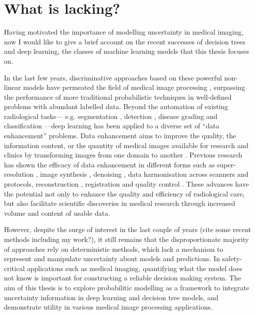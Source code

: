 \section{What is lacking?}
Having motivated the importance of modelling uncertainty in medical imaging, now I would like to give a brief account on the recent successes of decision trees and deep learning, the classes of machine learning models that this thesis focuses on. 

In the last few years, discriminative approaches based on these powerful non-linear models have permeated the field of medical image processing \cite{criminisi2013decision,shen2017deep,litjens2017survey}, surpassing the performance of more traditional probabilistic techniques in well-defined problems with abundant labelled data. Beyond the automation of existing radiological tasks--- e.g. segmentation \cite{kamnitsas2017efficient}, detection \cite{roth2014new}, disease grading and classification \cite{araujo2017classification}---deep learning has been applied to a diverse set of ``data enhancement'' problems. Data enhancement aims to improve the quality, the information content, or the quantity of medical images available for research and clinics by transforming images from one domain to another \cite{isola2017image}. Previous research has shown the efficacy of data enhancement in different forms such as super-resolution \cite{oktay2016multi,chen2018efficient,ravi2019adversarial}, image synthesis \cite{nie2016estimating,kang2017deep}, denoising \cite{benou2017ensemble,chen2017low}, data harmonisation \cite{karayumak2018harmonizing,tax2019cross} across scanners and protocols, reconstruction \cite{sun2016deep,jin2017deep,hammernik2018learning,schlemper2018deep,zhu2018image,yang2018dagan,yoon2019efficient}, registration \cite{sokooti2017nonrigid,balakrishnan2018unsupervised} and quality control \cite{wu2017fuiqa,esses2018automated}.  These advances have the potential not only to enhance the quality and efficiency of radiological care, but also facilitate scientific discoveries in medical research through increased volume and content of usable data. 

However, despite the surge of interest in the last couple of years (cite some recent methods including my work?),  it still remains that the disproportionate majority of approaches rely on deterministic methods, which lack a mechanism to represent and manipulate uncertainty about models and predictions. In safety-critical applications such as medical imaging, quantifying what the model does not know is important for constructing a reliable decision making system. The aim of this thesis is to explore probabilitic modelling as a framework to integrate uncertainty information in deep learning and decision tree models, and demonstrate utility in various medical image processing applications. 

